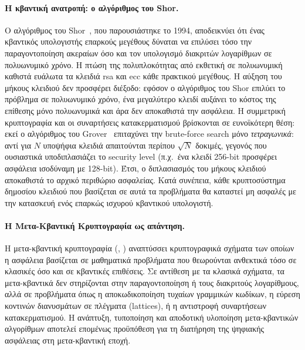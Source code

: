 \paragraph{Η κβαντική ανατροπή: ο αλγόριθμος του Shor.}
Ο αλγόριθμος του Shor~\cite{Shor1997}, που παρουσιάστηκε το 1994, αποδεικνύει
ότι ένας κβαντικός υπολογιστής επαρκούς μεγέθους δύναται να επιλύσει τόσο την
παραγοντοποίηση ακεραίων όσο και τον υπολογισμό διακριτών λογαρίθμων σε
πολυωνυμικό χρόνο. Η πτώση της πολυπλοκότητας από εκθετική σε πολυωνυμική καθιστά ευάλωτα τα
κλειδιά \gls{rsa} και \gls{ecc} κάθε πρακτικού μεγέθους. Η αύξηση του μήκους
κλειδιού δεν προσφέρει διέξοδο: εφόσον ο αλγόριθμος του Shor επιλύει το πρόβλημα
σε πολυωνυμικό χρόνο, ένα μεγαλύτερο κλειδί αυξάνει το κόστος της επίθεσης μόνο
πολυωνυμικά και άρα δεν αποκαθιστά την ασφάλεια. Η συμμετρική
κρυπτογραφία και οι συναρτήσεις κατακερματισμού βρίσκονται σε ευνοϊκότερη θέση:
εκεί ο αλγόριθμος του Grover~\cite{Grover1996} επιταχύνει την brute-force search μόνο \emph{τετραγωνικά}: αντί για $N$ υποψήφια κλειδιά απαιτούνται περίπου $\sqrt{N}$ δοκιμές, γεγονός που ουσιαστικά υποδιπλασιάζει το security level (π.χ.\ ένα κλειδί \num{256}-bit προσφέρει ασφάλεια ισοδύναμη με \num{128}-bit). Έτσι, ο διπλασιασμός του μήκους κλειδιού 
αποκαθιστά το αρχικό περιθώριο ασφαλείας. Κατά συνέπεια, κάθε κρυπτοσύστημα δημοσίου κλειδιού
που βασίζεται σε αυτά τα προβλήματα θα καταστεί μη ασφαλές με την κατασκευή ενός
επαρκώς ισχυρού κβαντικού υπολογιστή.

\paragraph{Η Μετα-Κβαντική Κρυπτογραφία ως απάντηση.}
Η μετα-κβαντική κρυπτογραφία (, ) αναπτύσσει κρυπτογραφικά σχήματα των οποίων η ασφάλεια βασίζεται σε
μαθηματικά προβλήματα που θεωρούνται ανθεκτικά τόσο σε κλασικές όσο και σε
κβαντικές επιθέσεις. Σε αντίθεση με τα κλασικά σχήματα, τα μετα-κβαντικά δεν
στηρίζονται στην παραγοντοποίηση ή τους διακριτούς λογαρίθμους, αλλά σε
προβλήματα όπως η αποκωδικοποίηση τυχαίων γραμμικών κωδίκων, η εύρεση κοντινών
διανυσμάτων σε πλέγματα (lattices), ή η αντιστροφή συναρτήσεων κατακερματισμού.
Η ανάπτυξη, τυποποίηση και αποδοτική υλοποίηση μετα-κβαντικών αλγορίθμων αποτελεί 
επομένως προϋπόθεση για τη διατήρηση της ψηφιακής ασφάλειας στη μετα-κβαντική εποχή.

